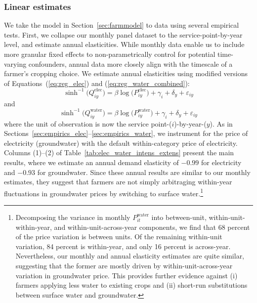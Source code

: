 \subsubsection{Linear estimates}
We take the model in Section~\ref{sec:farmmodel} to data using several empirical tests. First, we collapse our monthly panel dataset to the service-point-by-year level, and estimate annual elasticities. While monthly data enable us to include more granular fixed effects to non-parametrically control for potential time-varying confounders, annual data more closely align with the timescale of a farmer's cropping choice. We estimate annual elasticities using modified versions of Equations~(\ref{eq:reg_elec}) and (\ref{eq:reg_water_combined}):
\begin{equation}
\sinh^{-1}\big(Q^{\text{elec}}_{iy}\big) = \beta \log\big(P^{\text{elec}}_{iy}\big) + \gamma_{i} + \delta_y + \varepsilon_{iy}
\label{eq:reg_elec_annual}
\end{equation}
and
\begin{equation}
\sinh^{-1}\big(Q^{\text{water}}_{iy}\big) = \beta\log\big({P}^{\text{water}}_{iy}\big) + \gamma_{i} + \delta_y + \varepsilon_{iy} \label{eq:reg_water_annual} 
\end{equation}
where the unit of observation is now the service point-($i$)-by-year-($y$). As in Sections~\ref{sec:empirics_elec}--\ref{sec:empirics_water}, we instrument for the price of electricity (groundwater) with the default within-category price of electricity. Columns (1)--(2) of Table~\ref{tab:elec_water_intens_extens} present the main results, where we estimate an annual demand elasticity of $-0.99$ for electricity and $-0.93$ for groundwater. Since these annual results are similar to our monthly estimates, they suggest that farmers are not simply arbitraging within-year fluctuations in  groundwater prices by switching to surface water.\footnote{Decomposing the variance in monthly $P_{it}^{\text{water}}$ into between-unit, within-unit-within-year, and within-unit-across-year components, we find that 68 percent of the price variation is between units. Of the remaining within-unit variation, 84 percent is within-year, and only 16 percent is across-year. Nevertheless, our monthly and annual elasticity estimates are quite similar, suggesting that the former are mostly driven by within-unit-across-year variation in groundwater price. This provides further evidence against (i) farmers applying less water to existing crops and (ii) short-run substitutions between surface water and groundwater.}



